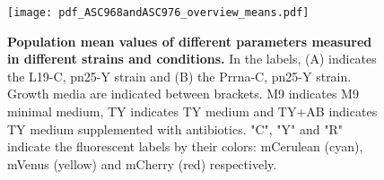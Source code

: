 \begin{figure}
    \centering
    \texttt{[image: pdf\_ASC968andASC976\_overview\_means.pdf]}
    \caption{ 
        \textbf{Population mean values of different parameters measured in different strains and conditions.}
        In the labels, (A) indicates the L19-C, pn25-Y strain and (B) the Prrna-C, pn25-Y strain.
        Growth media are indicated between brackets. 
        M9 indicates M9 minimal medium, TY indicates TY medium and TY+AB indicates TY medium supplemented with antibiotics.
        "C", "Y" and "R" indicate the fluorescent labels by their colors: mCerulean (cyan), mVenus (yellow) and mCherry (red) respectively.
    }
    \label{fig:ribo:meansPn25R}
\end{figure}



